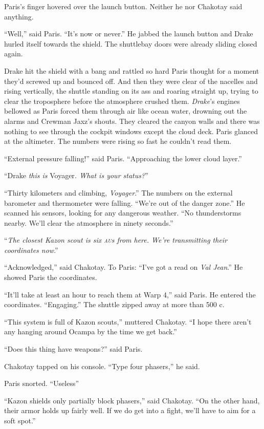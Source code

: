 \documentclass[twoside,letterpaper,12pt]{memoir}
\begin{document}
Paris's finger hovered over the launch button. Neither he nor Chakotay said anything.

``Well,'' said Paris. ``It's now or never.'' He jabbed the launch button and Drake hurled itself towards the shield. The shuttlebay doors were already sliding closed again.

Drake hit the shield with a bang and rattled so hard Paris thought for a moment they'd screwed up and bounced off. And then they were clear of the nacelles and rising vertically, the shuttle standing on its ass and roaring straight up, trying to clear the troposphere before the atmosphere crushed them. \textit{Drake}'s engines bellowed as Paris forced them through air like ocean water, drowning out the alarms and Crewman Jaxz's shouts. They cleared the canyon walls and there was nothing to see through the cockpit windows except the cloud deck. Paris glanced at the altimeter. The numbers were rising so fast he couldn't read them.

``External pressure falling!'' said Paris. ``Approaching the lower cloud layer.''

``Drake \textit{this is }Voyager\textit{. What is your status?}''

``Thirty kilometers and climbing, \textit{Voyager}.'' The numbers on the external barometer and thermometer were falling. ``We're out of the danger zone.'' He scanned his sensors, looking for any dangerous weather. ``No thunderstorms nearby. We'll clear the atmosphere in ninety seconds.''

``\textit{The closest Kazon scout is six \textsc{au}s from here. We're transmitting their coordinates now}.''

``Acknowledged,'' said Chakotay. To Paris: ``I've got a read on \textit{Val Jean}.'' He showed Paris the coordinates.

``It'll take at least an hour to reach them at Warp 4,'' said Paris. He entered the coordinates. ``Engaging.'' The shuttle zipped away at more than 500 c.

``This system is full of Kazon scouts,'' muttered Chakotay. ``I hope there aren't any hanging around Ocampa by the time we get back.''

``Does this thing have weapons?'' said Paris.

Chakotay tapped on his console. ``Type four phasers,'' he said.

Paris snorted. ``Useless''

``Kazon shields only partially block phasers,'' said Chakotay. ``On the other hand, their armor holds up fairly well. If we do get into a fight, we'll have to aim for a soft spot.''
\end{document}
